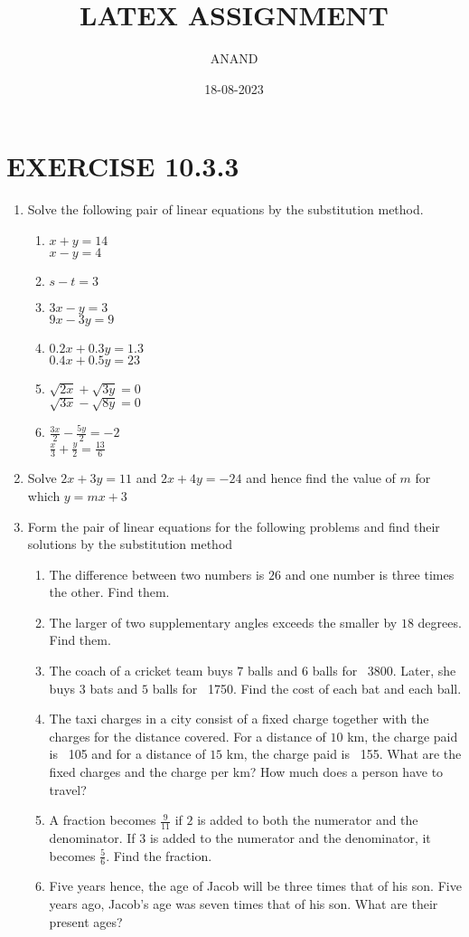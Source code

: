 \documentclass{article}
\theoremstyle{remark}
\begin{document}
\title{LATEX ASSIGNMENT}
\author{ANAND}
\date{18-08-2023}
\maketitle
\section*{EXERCISE 10.3.3}
\begin{enumerate}
\item Solve the following pair of linear equations by the substitution method.
    \begin{enumerate}[label=(\Roman*)]
    \item $x+y=14$ \\
          $x-y=4$
    \item $s-t=3$
    \item $3x-y=3$ \\
          $9x-3y=9$
    \item $0.2x+0.3y=1.3$ \\
          $0.4x+0.5y=23$
    \item $\sqrt{2x}+\sqrt{3y}=0$ \\
          $\sqrt{3x}-\sqrt{8y}=0$
    \item $\frac{3x}{2}-\frac{5y}{2}=-2$ \\
          $\frac{x}{3}+\frac{y}{2}=\frac{13}{6}$
    \end{enumerate}
\item Solve $2x+3y=11$ and $2x+4y=-24$ and hence find the value of $m$ for which $y=mx+3$
\item Form the pair of linear equations for the following problems and find their solutions by the substitution method
    \begin{enumerate}[label=(\Roman*)]
    \item The difference between two numbers is $26$ and one number is three times the other. Find them.
    \item The larger of two supplementary angles exceeds the smaller by $18$ degrees. Find them.
    \item The coach of a cricket team buys $7$ balls and $6$ balls for \rupee~3800. Later, she buys $3$ bats and $5$ balls for \rupee~1750. Find the cost of each bat and each ball.
    \item The taxi charges in a city consist of a fixed charge together with the charges for the distance covered. For a distance of $10$ km, the charge paid is \rupee~105 and for a distance of $15$ km, the charge paid is \rupee~155. What are the fixed charges and the charge per km? How much does a person have to travel?
    \item A fraction becomes $\frac{9}{11}$ if $2$ is added to both the numerator and the denominator. If $3$ is added to the numerator and the denominator, it becomes $\frac{5}{6}$. Find the fraction.
    \item Five years hence, the age of Jacob will be three times that of his son. Five years ago, Jacob's age was seven times that of his son. What are their present ages?
    \end{enumerate}
\end{enumerate}
\end{document}
